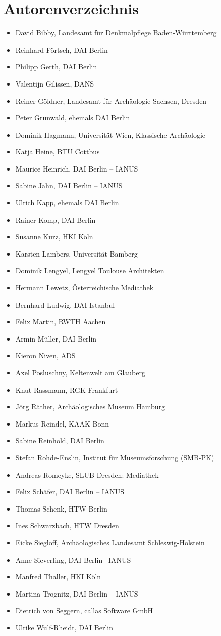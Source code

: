 \chapter{Autorenverzeichnis}

\begin{itemize}
	\item David Bibby, Landesamt für Denkmalpflege Baden-Württemberg
	\item Reinhard Förtsch, DAI Berlin
	\item Philipp Gerth, DAI Berlin
	\item Valentijn Gilissen, DANS
	\item Reiner Göldner, Landesamt für Archäologie Sachsen, Dresden
	\item Peter Grunwald, ehemals DAI Berlin
	\item Dominik Hagmann, Universität Wien, Klassische Archäologie
	\item Katja Heine, BTU Cottbus
	\item Maurice Heinrich, DAI Berlin -- IANUS
	\item Sabine Jahn, DAI Berlin -- IANUS
	\item Ulrich Kapp, ehemals DAI Berlin
	\item Rainer Komp, DAI Berlin
	\item Susanne Kurz, HKI Köln
	\item Karsten Lambers, Universität Bamberg
	\item Dominik Lengyel, Lengyel Toulouse Architekten
	\item Hermann Lewetz, Österreichische Mediathek
	\item Bernhard Ludwig, DAI Istanbul
	\item Felix Martin, RWTH Aachen
	\item Armin Müller, DAI Berlin
	\item Kieron Niven, ADS
	\item Axel Posluschny, Keltenwelt am Glauberg
	\item Knut Rassmann, RGK Frankfurt
	\item Jörg Räther, Archäologisches Museum Hamburg
	\item Markus Reindel, KAAK Bonn
	\item Sabine Reinhold, DAI Berlin
	\item Stefan Rohde-Enslin, Institut für Museumsforschung (SMB-PK)
	\item Andreas Romeyke, SLUB Dresden: Mediathek
	\item Felix Schäfer, DAI Berlin -- IANUS
	\item Thomas Schenk, HTW Berlin
	\item Ines Schwarzbach, HTW Dresden
	\item Eicke Siegloff, Archäologisches Landesamt Schleswig-Holstein
	\item Anne Sieverling, DAI Berlin --IANUS
	\item Manfred Thaller, HKI Köln
	\item Martina Trognitz, DAI Berlin -- IANUS
	\item Dietrich von Seggern, callas Software GmbH
	\item Ulrike Wulf-Rheidt, DAI Berlin
\end{itemize}
